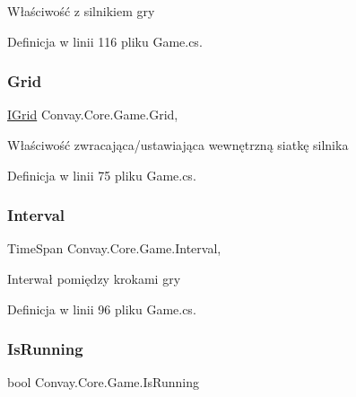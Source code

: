 Właściwość z silnikiem gry 



Definicja w linii 116 pliku Game.\+cs.

\hypertarget{class_convay_1_1_core_1_1_game_a079870860cd4f61916e99b839750e520}{}\label{class_convay_1_1_core_1_1_game_a079870860cd4f61916e99b839750e520} 
\subsubsection{\texorpdfstring{Grid}{Grid}}
{\footnotesize\ttfamily \hyperlink{interface_convay_1_1_core_1_1_interfaces_1_1_i_grid}{I\+Grid} Convay.\+Core.\+Game.\+Grid\hspace{0.3cm}{\ttfamily [get]}, {\ttfamily [set]}}



Właściwość zwracająca/ustawiająca wewnętrzną siatkę silnika 



Definicja w linii 75 pliku Game.\+cs.

\hypertarget{class_convay_1_1_core_1_1_game_aafac64f23595335c918fa666223482c8}{}\label{class_convay_1_1_core_1_1_game_aafac64f23595335c918fa666223482c8} 
\subsubsection{\texorpdfstring{Interval}{Interval}}
{\footnotesize\ttfamily Time\+Span Convay.\+Core.\+Game.\+Interval\hspace{0.3cm}{\ttfamily [get]}, {\ttfamily [set]}}



Interwał pomiędzy krokami gry 



Definicja w linii 96 pliku Game.\+cs.

\hypertarget{class_convay_1_1_core_1_1_game_ac770d7f2afda52d82efcc0882463de6d}{}\label{class_convay_1_1_core_1_1_game_ac770d7f2afda52d82efcc0882463de6d} 
\subsubsection{\texorpdfstring{Is\+Running}{IsRunning}}
{\footnotesize\ttfamily bool Convay.\+Core.\+Game.\+Is\+Running\hspace{0.3cm}{\ttfamily [get]}}



